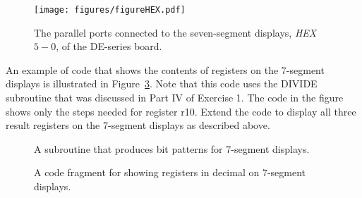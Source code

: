 \documentclass[epsfig,10pt,fullpage]{article}
\newcommand{\CommonDocsPath}{../../../../common/docs}
\begin{document}
\begin{figure}[H]
	\begin{center}
	\texttt{[image: figures/figureHEX.pdf]}
	\end{center}
	\caption{The parallel ports connected to the seven-segment displays, {\it HEX}$5-0$, of the DE-series board.}
\label{fig:HEX}
\end{figure}

An example of code that shows the contents of registers on the 7-segment displays is
illustrated in Figure~\ref{fig:codefrag}. Note that this code uses the DIVIDE subroutine that 
was discussed in Part IV of Exercise 1.  The code in the figure shows only the steps needed 
for register r10.  Extend the code to display all three result registers on the 7-segment
displays as described above.

\begin{figure}[H]
\begin{center}

\end{center}
\caption{A subroutine that produces bit patterns for 7-segment displays.}
\label{fig:code7}
\end{figure}

\begin{figure}[H]
\begin{center}

\end{center}
\caption{A code fragment for showing registers in decimal on 7-segment displays.}
\label{fig:codefrag}
\end{figure}



\end{document}
